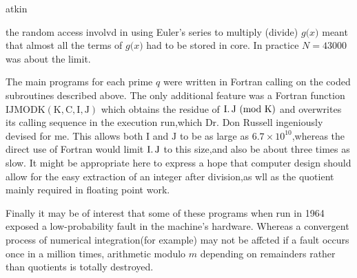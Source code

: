 \begin{flushright}
atkin 
\end{flushright}

\reversemarginpar the random access involvd in using Euler's series to multiply (divide) \uline{$g(x$}$)$ meant that almost all the terms of \uline{$g(x$}$)$ had to be stored in core. In practice $N=43000$ was about the limit.

The main programs for each prime \uline{$q$} were written in Fortran calling on the coded subroutines described above. The only additional feature was a Fortran function $\mathrm{IJMODK}(\mathrm{K},\mathrm{C},\mathrm{I},\mathrm{J})$ which obtains the residue of $\mathrm{I}\ldotp\mathrm{J}\ (\mathrm{mod}\ \mathrm{K})$ and overwrites its calling sequence in the\normalmarginpar{} execution run,which Dr. Don Russell ingeniously devised for me. This allows both $\mathrm{I}$ and $\mathrm{J}$ to be as large as $6.7\times10^{10}$,whereas the direct use of Fortran would limit $\mathrm{I}\ldotp\mathrm{J}$ to this size,and also be about three times as slow. It might be appropriate here to express a hope that computer design should allow for the easy extraction of an integer \uline{} after division,as \reversemarginpar wll as the quotient mainly required in floating point work.

Finally it may be of interest that some of these programs when run in 1964 exposed a low-probability  fault in the machine's hardware. Whereas a convergent process of numerical integration(for example) may not be affcted if a fault occurs once in a million times, arithmetic modulo \uline{$m$} depending on remainders rather than quotients is totally destroyed.
\normalmarginpar
